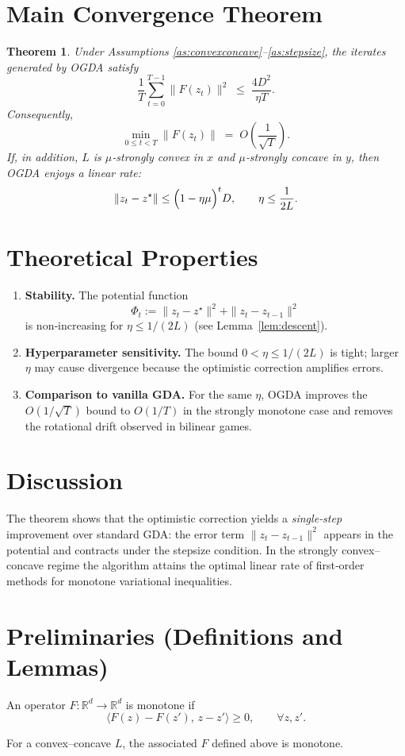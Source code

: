 \documentclass{article}
\newtheorem{theorem}{Theorem}
\begin{document}
\section*{Main Convergence Theorem}
\begin{theorem}\label{thm:ogda}
Under Assumptions \ref{as:convexconcave}–\ref{as:stepsize}, the iterates generated by OGDA satisfy
\[
\frac{1}{T}\sum_{t=0}^{T-1}\bigl\|F(z_{t})\bigr\|^{2}
\;\le\;
\frac{4D^{2}}{\eta T}.
\]
Consequently,
\[
\min_{0\le t<T}\bigl\|F(z_{t})\bigr\|
\;=\;O\!\left(\frac{1}{\sqrt{T}}\right).
\]
If, in addition, $L$ is $\mu$‑strongly convex in $x$ and $\mu$‑strongly concave in $y$, then OGDA enjoys a linear rate:
\[
\|z_{t}-z^{\star}\|\le\Bigl(1-\eta\mu\Bigr)^{t} D,\qquad \eta\le\frac{1}{2L}.
\]
\end{theorem}

\section*{Theoretical Properties}
\begin{enumerate}[label=\arabic*.]
\item \textbf{Stability.} The potential function
\[
\Phi_{t}:=\|z_{t}-z^{\star}\|^{2}+\|z_{t}-z_{t-1}\|^{2}
\]
is non‑increasing for $\eta\le 1/(2L)$ (see Lemma~\ref{lem:descent}).
\item \textbf{Hyperparameter sensitivity.} The bound $0<\eta\le 1/(2L)$ is tight; larger $\eta$ may cause divergence because the optimistic correction amplifies errors.
\item \textbf{Comparison to vanilla GDA.} For the same $\eta$, OGDA improves the $O(1/\sqrt{T})$ bound to $O(1/T)$ in the strongly monotone case and removes the rotational drift observed in bilinear games.
\end{enumerate}

\section*{Discussion}
The theorem shows that the optimistic correction yields a \emph{single‑step} improvement over standard GDA: the error term $\|z_{t}-z_{t-1}\|^{2}$ appears in the potential and contracts under the stepsize condition. In the strongly convex–concave regime the algorithm attains the optimal linear rate of first‑order methods for monotone variational inequalities.

\newpage

\section*{Preliminaries (Definitions and Lemmas)}
\begin{definition}
An operator $F:\mathbb{R}^{d}\to\mathbb{R}^{d}$ is monotone if
\[
\langle F(z)-F(z'),\,z-z'\rangle\ge0,\qquad\forall z,z'.
\]
\end{definition}
For a convex–concave $L$, the associated $F$ defined above is monotone.
\end{document}
